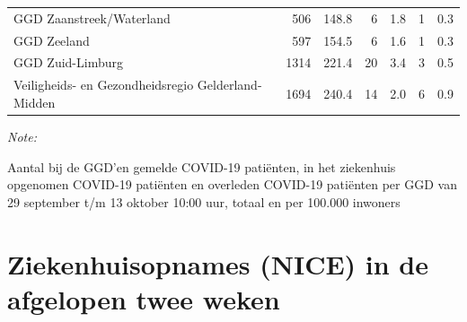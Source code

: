 \documentclass[
  english,
  man,floatsintext]{apa6}
\begin{document}
\begin{table}
\begin{threeparttable}
\begin{tabular}{lrrrrrr}
GGD Zaanstreek/Waterland & 506 & 148.8 & 6 & 1.8 & 1 & 0.3\\
GGD Zeeland & 597 & 154.5 & 6 & 1.6 & 1 & 0.3\\
GGD Zuid-Limburg & 1314 & 221.4 & 20 & 3.4 & 3 & 0.5\\
Veiligheids- en Gezondheidsregio Gelderland-Midden & 1694 & 240.4 & 14 & 2.0 & 6 & 0.9\\
\bottomrule
\end{tabular}
\begin{tablenotes}
\item \textit{Note: } 
\item Aantal bij de GGD’en gemelde COVID-19 patiënten, in het ziekenhuis opgenomen COVID-19 patiënten en overleden COVID-19 patiënten per GGD van 29 september t/m 13 oktober 10:00 uur, totaal en per 100.000 inwoners
\end{tablenotes}
\end{threeparttable}
\endgroup{}
\end{table}

\newpage

\hypertarget{ziekenhuisopnames-nice-in-de-afgelopen-twee-weken}{%
\section{Ziekenhuisopnames (NICE) in de afgelopen twee weken}\label{ziekenhuisopnames-nice-in-de-afgelopen-twee-weken}}
\end{document}
